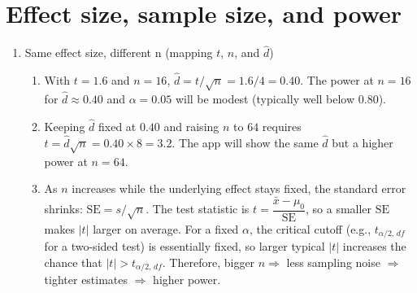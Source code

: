 \documentclass[12pt,a4paper]{article}
\providecommand{\tightlist}{%
  \setlength{\itemsep}{0pt}\setlength{\parskip}{0pt}}
\begin{document}
\onehalfspacing

\section*{Effect size, sample size, and
power}\label{effect-size-sample-size-and-power}

\begin{enumerate}
\def\labelenumi{\arabic{enumi}.}
\tightlist
\item
  Same effect size, different n (mapping \(t\), \(n\), and \(\hat d\))

  \begin{enumerate}
  \def\labelenumii{\alph{enumii}.}
  \tightlist
  \item
    With \(t=1.6\) and \(n=16\), \(\hat d = t/\sqrt{n} = 1.6/4 = 0.40\).
    The power at \(n=16\) for \(\hat d \approx 0.40\) and
    \(\alpha=0.05\) will be modest (typically well below \(0.80\)).
  \item
    Keeping \(\hat d\) fixed at \(0.40\) and raising \(n\) to \(64\)
    requires \(t = \hat d \sqrt{n} = 0.40 \times 8 = 3.2\). The app will
    show the same \(\hat d\) but a higher power at \(n=64\).
  \item
    As \(n\) increases while the underlying effect stays fixed, the
    standard error shrinks: \(\mathrm{SE} = s/\sqrt{n}\). The test
    statistic is \(t = \dfrac{\bar{x}-\mu_0}{\mathrm{SE}}\), so a
    smaller \(\mathrm{SE}\) makes \(|t|\) larger on average. For a fixed
    \(\alpha\), the critical cutoff (e.g., \(t_{\alpha/2,\,df}\) for a
    two-sided test) is essentially fixed, so larger typical \(|t|\)
    increases the chance that \(|t| > t_{\alpha/2,\,df}\). Therefore,
    bigger \(n \Rightarrow\) less sampling noise \(\Rightarrow\) tighter
    estimates \(\Rightarrow\) higher power.
  \end{enumerate}
\end{enumerate}

\bigskip
\end{document}
